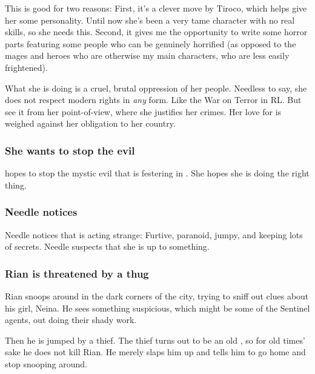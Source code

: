 This is good for two reasons: 
First, it's a clever move by Tiroco, which helps give her some personality. Until now she's been a very tame character with no real skills, so she needs this. 
Second, it gives me the opportunity to write some horror parts featuring some  people who can be genuinely horrified (as opposed to the mages and heroes who are otherwise my main characters, who are less easily frightened). 

What she is doing is a cruel, brutal oppression of her people. Needless to say, she does not respect modern \human{} rights in \emph{any} form. Like the War on Terror in RL. But see it from her point-of-view, where she justifies her crimes. Her love for \Icor{} is weighed against her obligation to her country. 





\subsubsection{She wants to stop the evil}
\Tiroco{} hopes to stop the mystic evil that is festering in \Malcur. 
She hopes she is doing the right thing. 









\subsubsection{Needle notices \Tiroco}
Needle notices that \Tiroco{} is acting strange: 
Furtive, paranoid, jumpy, and keeping lots of secrets. 
Needle suspects that she is up to something. 






\subsubsection{Rian is threatened by a thug}
Rian snoops around in the dark corners of the city, trying to sniff out clues about his girl, Neina. 
He sees something suspicious, 
which might be some of the Sentinel agents, out doing their shady work. 

Then he is jumped by a thief. The thief turns out to be an old , so for old times' sake he does not kill Rian. He merely slaps him up and tells him to go home and stop snooping around. 









